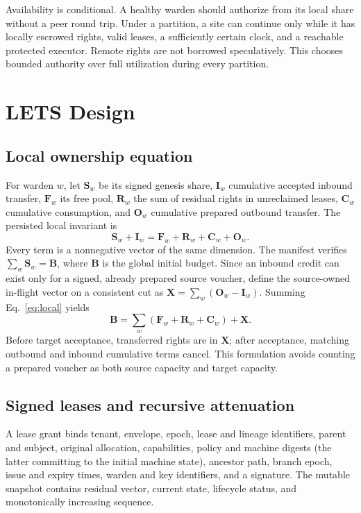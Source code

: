 \documentclass[10pt]{article}
\newcommand{\vect}[1]{\boldsymbol{#1}}
\begin{document}
Availability is conditional. A healthy warden should authorize from its local share without a
peer round trip. Under a partition, a site can continue only while it has locally escrowed rights,
valid leases, a sufficiently certain clock, and a reachable protected executor. Remote rights are
not borrowed speculatively. This chooses bounded authority over full utilization during every
partition.

\section{LETS Design}

\subsection{Local ownership equation}

For warden $w$, let $\vect{S}_w$ be its signed genesis share, $\vect{I}_w$ cumulative accepted
inbound transfer, $\vect{F}_w$ its free pool, $\vect{R}_w$ the sum of residual rights in
unreclaimed leases, $\vect{C}_w$ cumulative consumption, and $\vect{O}_w$ cumulative prepared
outbound transfer. The persisted local invariant is
\begin{equation}
  \vect{S}_w + \vect{I}_w
  = \vect{F}_w + \vect{R}_w + \vect{C}_w + \vect{O}_w.
  \label{eq:local}
\end{equation}
Every term is a nonnegative vector of the same dimension. The manifest verifies
$\sum_w \vect{S}_w = \vect{B}$, where $\vect{B}$ is the global initial budget. Since an inbound
credit can exist only for a signed, already prepared source voucher, define the source-owned
in-flight vector on a consistent cut as
$\vect{X}=\sum_w(\vect{O}_w-\vect{I}_w)$. Summing Eq.~\ref{eq:local} yields
\begin{equation}
  \vect{B}
  = \sum_w (\vect{F}_w + \vect{R}_w + \vect{C}_w) + \vect{X}.
  \label{eq:global}
\end{equation}
Before target acceptance, transferred rights are in $\vect{X}$; after acceptance, matching
outbound and inbound cumulative terms cancel. This formulation avoids counting a prepared
voucher as both source capacity and target capacity.

\subsection{Signed leases and recursive attenuation}

A lease grant binds tenant, envelope, epoch, lease and lineage identifiers, parent and subject,
original allocation, capabilities, policy and machine digests (the latter committing to the
initial machine state), ancestor path, branch epoch, issue and expiry times, warden and key
identifiers, and a signature. The
mutable snapshot contains residual vector, current state, lifecycle status, and monotonically
increasing sequence.
\end{document}
